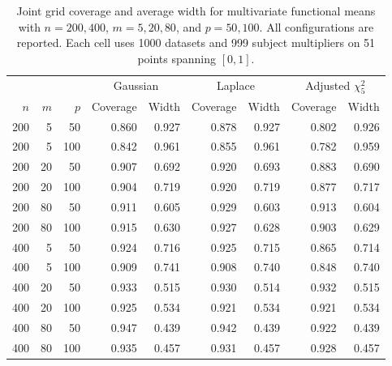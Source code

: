 \begin{table}[!tbp]
\centering
\caption{Joint grid coverage and average width for multivariate functional means with $n=200,400$, $m=5,20,80$, and $p=50,100$. All configurations are reported. Each cell uses 1000 datasets and 999 subject multipliers on 51 points spanning $[0,1]$.}
\label{tab:highd-mean}
\small
\setlength{\tabcolsep}{4pt}
\begin{tabular}{rrrrrrrrr}
\toprule
& & & \multicolumn{2}{c}{Gaussian} & \multicolumn{2}{c}{Laplace} & \multicolumn{2}{c}{Adjusted $\chi^2_5$}\\
$n$ & $m$ & $p$ & Coverage & Width & Coverage & Width & Coverage & Width\\
\midrule
200 & 5 & 50 & 0.860 & 0.927 & 0.878 & 0.927 & 0.802 & 0.926\\
200 & 5 & 100 & 0.842 & 0.961 & 0.855 & 0.961 & 0.782 & 0.959\\
\midrule
200 & 20 & 50 & 0.907 & 0.692 & 0.920 & 0.693 & 0.883 & 0.690\\
200 & 20 & 100 & 0.904 & 0.719 & 0.920 & 0.719 & 0.877 & 0.717\\
\midrule
200 & 80 & 50 & 0.911 & 0.605 & 0.929 & 0.603 & 0.913 & 0.604\\
200 & 80 & 100 & 0.915 & 0.630 & 0.927 & 0.628 & 0.903 & 0.629\\
\midrule
400 & 5 & 50 & 0.924 & 0.716 & 0.925 & 0.715 & 0.865 & 0.714\\
400 & 5 & 100 & 0.909 & 0.741 & 0.908 & 0.740 & 0.848 & 0.740\\
\midrule
400 & 20 & 50 & 0.933 & 0.515 & 0.930 & 0.514 & 0.932 & 0.515\\
400 & 20 & 100 & 0.925 & 0.534 & 0.921 & 0.534 & 0.921 & 0.534\\
\midrule
400 & 80 & 50 & 0.947 & 0.439 & 0.942 & 0.439 & 0.922 & 0.439\\
400 & 80 & 100 & 0.935 & 0.457 & 0.931 & 0.457 & 0.928 & 0.457\\
\bottomrule
\end{tabular}
\end{table}
